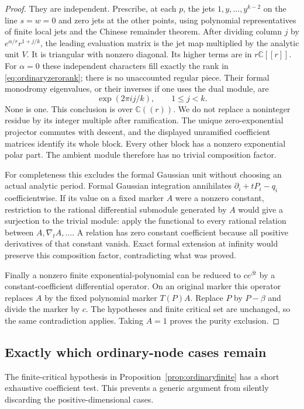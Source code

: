 \documentclass[11pt]{article}
\theoremstyle{definition}\newtheorem{definition}[theorem]{Definition}
\theoremstyle{remark}\newtheorem{remark}[theorem]{Remark}
\newcommand{\C}{\mathbb C}
\begin{document}
\begin{proof}
They are independent. Prescribe, at each $p$, the jets
$1,y,\ldots,y^{k-2}$ on the line $s=w=0$ and zero jets at the
other points, using polynomial representatives of finite local
jets and the Chinese remainder theorem. After dividing column
$j$ by $e^{\alpha/r}r^{1+j/k}$, the leading evaluation matrix is
the jet map multiplied by the analytic unit $V$. It is triangular
with nonzero diagonal. Its higher terms are in $r\C[[r]]$.
For $\alpha=0$ these independent characters fill exactly the rank
in \eqref{eq:ordinaryzerorank}; there is no unaccounted regular
piece. Their formal monodromy eigenvalues, or their inverses if
one uses the dual module, are
\[
 \exp(2\pi i j/k),\qquad 1\le j<k.
\]
None is one. This conclusion is over $\C((r))$. We do not replace
a noninteger residue by its integer multiple after ramification.
The unique zero-exponential projector commutes with descent, and
the displayed unramified coefficient matrices identify its whole
block. Every other block has a nonzero exponential polar part.
The ambient module therefore has no trivial composition factor.

For completeness this excludes the formal Gaussian unit without
choosing an actual analytic period. Formal Gaussian integration
annihilates $\partial_i+tP_i-q_i$ coefficientwise. If its value
on a fixed marker $A$ were a nonzero constant, restriction to the
rational differential submodule generated by $A$ would give a
surjection to the trivial module: apply the functional to every
rational relation between $A,\nabla_tA,\ldots$. A relation has
zero constant coefficient because all positive derivatives of
that constant vanish. Exact formal extension at infinity would
preserve this composition factor, contradicting what was proved.

Finally a nonzero finite exponential-polynomial can be reduced
to $c e^{\beta t}$ by a constant-coefficient differential
operator. On an original marker this operator replaces $A$ by
the fixed polynomial marker $T(P)A$. Replace $P$ by $P-\beta$
and divide the marker by $c$. The hypotheses and finite critical
set are unchanged, so the same contradiction applies. Taking
$A=1$ proves the purity exclusion.
\end{proof}

\subsection{Exactly which ordinary-node cases remain}

The finite-critical hypothesis in Proposition~\ref{prop:ordinaryfinite}
has a short exhaustive coefficient test. This prevents a generic
argument from silently discarding the positive-dimensional cases.
\end{document}

